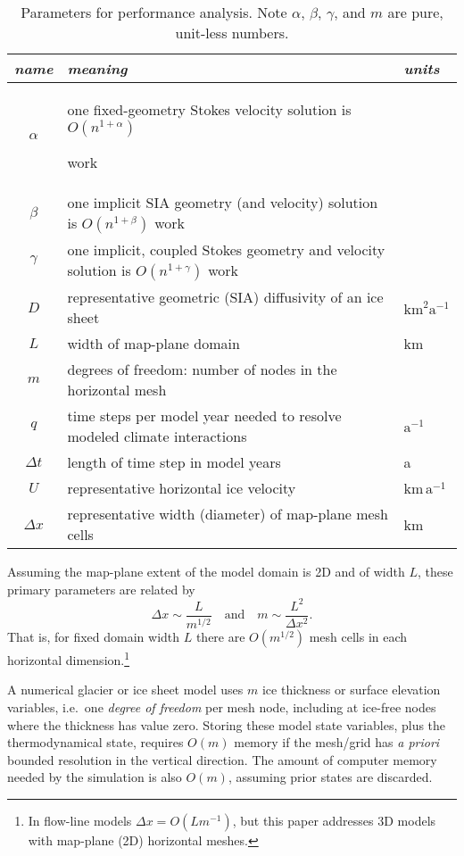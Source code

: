 \documentclass[review,letterpaper]{igs}
\begin{document}
\begin{table*}[ht]
{\normalsize
\begin{tabular}{cll}
\emph{name} & \emph{meaning} & \emph{units} \\ \hline
$\alpha$    & one fixed-geometry Stokes velocity solution is $O(n^{1+\alpha})${\large \strut} work\\
$\beta$     & one implicit SIA geometry (and velocity) solution is $O(n^{1+\beta})$ work \\
$\gamma$    & one implicit, coupled Stokes geometry and velocity solution is $O(n^{1+\gamma})$ work \\
$D$         & representative geometric (SIA) diffusivity of an ice sheet & $\text{km}^2 \text{a}^{-1}$ \\
$L$         & width of map-plane domain & km \\
$m$         & degrees of freedom: number of nodes in the horizontal mesh \\
$q$         & time steps per model year needed to resolve modeled climate interactions & $\text{a}^{-1}$ \\
$\Delta t$  & length of time step in model years & a \\
$U$         & representative horizontal ice velocity & $\text{km}\,\text{a}^{-1}$ \\
$\Delta x$  & representative width (diameter) of map-plane mesh cells & km
\end{tabular}
}
\caption{Parameters for performance analysis.  Note $\alpha$, $\beta$, $\gamma$, and $m$ are pure, unit-less numbers.}
\label{tab:notation}
\end{table*}

Assuming the map-plane extent of the model domain is 2D and of width $L$, these primary parameters are related by
\begin{equation}
\Delta x \sim \frac{L}{m^{1/2}} \quad \text{and} \quad m \sim \frac{L^2}{\Delta x^2}.  \label{eq:paramrelation}
\end{equation}
That is, for fixed domain width $L$ there are $O(m^{1/2})$ mesh cells in each horizontal dimension.\footnote{In flow-line models $\Delta x = O(L m^{-1})$, but this paper addresses 3D models with map-plane (2D) horizontal meshes.}

A numerical glacier or ice sheet model uses $m$ ice thickness or surface elevation variables, i.e.~one \emph{degree of freedom} per mesh node, including at ice-free nodes where the thickness has value zero.  Storing these model state variables, plus the thermodynamical state, requires $O(m)$ memory if the mesh/grid has \emph{a priori} bounded resolution in the vertical direction.  The amount of computer memory needed by the simulation is also $O(m)$, assuming prior states are discarded.
\end{document}
